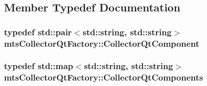 \subsection{Member Typedef Documentation}
\hypertarget{classmts_collector_qt_factory_a8860ea4a5149d8f748ad9e3e32d6b271}{
\subsubsection[{Collector\-Qt\-Component}]{\setlength{\rightskip}{0pt plus 5cm}typedef std\-::pair$<$std\-::string, std\-::string$>$ {\bf mts\-Collector\-Qt\-Factory\-::\-Collector\-Qt\-Component}\hspace{0.3cm}{\ttfamily [protected]}}}\label{classmts_collector_qt_factory_a8860ea4a5149d8f748ad9e3e32d6b271}
\hypertarget{classmts_collector_qt_factory_a328adc18f15a7e2e39af3d30ba436c04}{
\subsubsection[{Collector\-Qt\-Components}]{\setlength{\rightskip}{0pt plus 5cm}typedef std\-::map$<$std\-::string, std\-::string$>$ {\bf mts\-Collector\-Qt\-Factory\-::\-Collector\-Qt\-Components}\hspace{0.3cm}{\ttfamily [protected]}}}\label{classmts_collector_qt_factory_a328adc18f15a7e2e39af3d30ba436c04}


